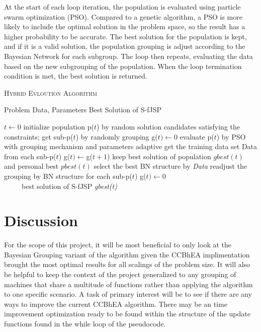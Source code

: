 \documentclass[11pt]{article}
\begin{document}
At the start of each loop iteration, the population is evaluated using particle swarm optimization (PSO). Compared to a genetic algorithm, a PSO is more likely to include the optimal solution in the problem space, so the result has a higher probability to be accurate\cite{sun2015bayesian}. The best solution for the population is kept, and if it is a valid solution, the population grouping is adjust according to the Bayesian Network for each subgroup. The loop then repeats, evaluating the data based on the new subgrouping of the population. When the loop termination condition is met, the best solution is returned.

\begin{algorithm}\caption{\textsc{Hybrid Evloution Algorithm}}
 \begin{algorithmic}[1]
    Problem Data, Parameters
    Best Solution of S-fJSP
   
   \State $t \gets 0$
   \State initialize population p($t$) by random solution candidates satisfying the constraints;
 get sub-p($t$) by randomly grouping
 	\State g($t) \gets 0$
	\State evaluate p($t$) by PSO with grouping mechanism and parameters adaptive
 	\State get the training data set Data from each sub-p($t$)
 	\State g($t) \gets $g($t + 1$)
 	\State keep best solution of population $gbest(t)$ and personal best $pbest(t)$
 	\State select the best BN structure by \textit{Data}
 	\State readjust the grouping by BN structure for each sub-p($t$)
 	\State g($t) \gets 0$
 	\EndIf
        \EndWhile\\
~~~~~\Return best solution of S-fJSP \textit{gbest(t)}
 \end{algorithmic}
\end{algorithm}

\section{Discussion}
For the scope of this project, it will be most beneficial to only look at the Bayesian Grouping variant of the algorithm given the CCBhEA implimentation brought the most optimal results for all scalings of the problem size. It will also be helpful to keep the context of the project generalized to any grouping of machines that share a multitude of functions rather than applying the algorithm to one specific scenario. A task of primary interest will be to see if there are any ways to improve the current CCBhEA algorithm. There may be an time improvement optimization ready to be found within the structure of the update functions found in the while loop of the pseudocode.



\end{document}
